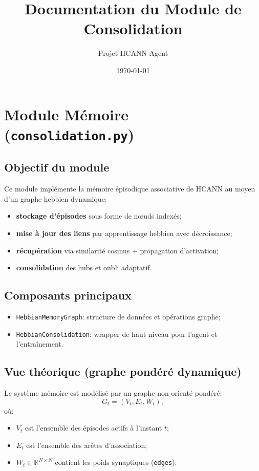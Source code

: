 \documentclass[12pt,a4paper]{article}
\title{Documentation du Module de Consolidation}
\author{Projet HCANN-Agent}
\date{\today}
\begin{document}
\maketitle

\section{Module Mémoire (\texttt{consolidation.py})}

\subsection{Objectif du module}
Ce module implémente la mémoire épisodique associative de HCANN au moyen d'un graphe hebbien dynamique:
\begin{itemize}
    \item \textbf{stockage d'épisodes} sous forme de n\oe uds indexés;
    \item \textbf{mise à jour des liens} par apprentissage hebbien avec décroissance;
    \item \textbf{récupération} via similarité cosinus + propagation d'activation;
    \item \textbf{consolidation} des hubs et oubli adaptatif.
\end{itemize}

\subsection{Composants principaux}
\begin{itemize}
    \item \texttt{HebbianMemoryGraph}: structure de données et opérations graphe;
    \item \texttt{HebbianConsolidation}: wrapper de haut niveau pour l'agent et l'entraînement.
\end{itemize}

\subsection{Vue théorique (graphe pondéré dynamique)}
Le système mémoire est modélisé par un graphe non orienté pondéré:
\begin{equation}
G_t = (V_t, E_t, W_t),
\end{equation}
où:
\begin{itemize}
    \item $V_t$ est l'ensemble des épisodes actifs à l'instant $t$;
    \item $E_t$ est l'ensemble des arêtes d'association;
    \item $W_t \in \mathbb{R}^{N\times N}$ contient les poids synaptiques (\texttt{edges}).
\end{itemize}
\end{document}
